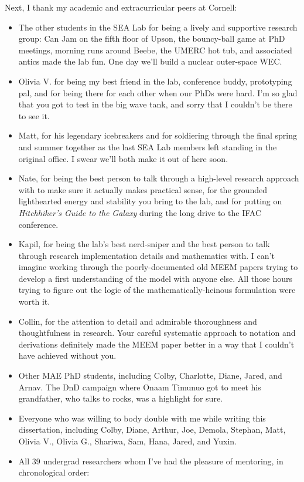 Next, I thank my academic and extracurricular peers at Cornell:
\begin{itemize}
  \item The other students in the SEA Lab for being a lively and supportive research group: 
  Can Jam on the fifth floor of Upson, the bouncy-ball game at PhD meetings, morning runs around Beebe, the UMERC hot tub, and associated antics made the lab fun. One day we'll build a nuclear outer-space WEC.
  \item Olivia V. for being my best friend in the lab, conference buddy, 
  prototyping pal, and for being there for each other when our PhDs were hard. I'm so glad that you got to test in the big wave tank, and sorry that I couldn't be there to see it.
  \item Matt, for his legendary icebreakers and for soldiering through the final spring and summer together as the last SEA Lab members left standing in the original office. I swear we'll both make it out of here soon.
  \item Nate, for being the best person to talk through a high-level research approach with to make sure it actually makes practical sense,
  for the grounded lighthearted energy and stability you bring to the lab,
  and for putting on \textit{Hitchhiker's Guide to the Galaxy} during the long drive to the IFAC conference.
  \item Kapil, for being the lab's best nerd-sniper and the best person to talk through research implementation details and mathematics with.
  I can't imagine working through the poorly-documented old MEEM papers trying to develop a first understanding of the model with anyone else.
  All those hours trying to figure out the logic of the mathematically-heinous formulation were worth it.
  \item Collin, for the attention to detail and admirable thoroughness and thoughtfulness in research. Your careful systematic approach to notation and derivations definitely made the MEEM paper better in a way that I couldn't have achieved without you.
  \item Other MAE PhD students, including Colby, Charlotte, Diane, Jared, and Arnav. 
  The DnD campaign where Onaam Timunuo got to meet his grandfather, who talks to rocks, was a highlight for sure.
  \item Everyone who was willing to body double with me while writing this dissertation, including 
  Colby, Diane, Arthur, Joe, Demola, Stephan, Matt, Olivia V., Olivia G., Shariwa, Sam, Hana, Jared, and Yuxin.
  \item All 39 undergrad researchers whom I've had the pleasure of mentoring, in chronological order:

\end{itemize}
